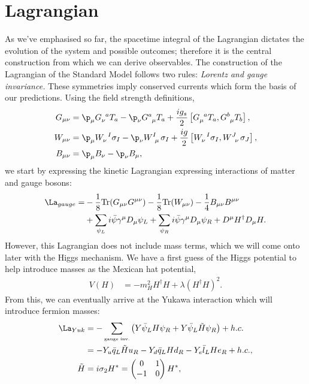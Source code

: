 \documentclass[relqm.tex]{subfiles}
\begin{document}
\section{Lagrangian}
As we've emphasised so far, the spacetime integral of the Lagrangian dictates the evolution of the system and possible outcomes; therefore it is the central construction from which we can derive observables.
The construction of the Lagrangian of the Standard Model follows two rules: \emph{Lorentz and gauge invariance.}
These symmetries imply conserved currents which form the basis of our predictions.
Using the field strength definitions, 
\begin{align}
    G_{\mu\nu} &= \p_\mu \tensor{G}{_\nu^a}T_a - \p_\nu\tensor{G}{^a_\mu}T_a + \frac{ig_s}{2}\left[\tensor{G}{_\mu^a}T_a,\tensor{G}{^b_\mu}T_b\right], \\
    W_{\mu\nu} &= \p_\mu \tensor{W}{_\nu^I}\sigma_I - \p_\nu\tensor{W}{^I_\mu}\sigma_I + \frac{ig}{2}\left[\tensor{W}{_\nu^I}\sigma_I,\tensor{W}{^J_\nu}\sigma_J\right], \\
    B_{\mu\nu} &= \p_\mu B_\nu - \p_\nu B_\mu,
\end{align}
we start by expressing the kinetic Lagrangian expressing interactions of matter and gauge bosons:
\begin{align}
    \begin{split}
        \La_{gauge} = &-\frac18\text{Tr}(G_{\mu\nu}G^{\mu\nu})-\frac18\text{Tr}(W_{\mu\nu}) - \frac14B_{\mu\nu}B^{\mu\nu} \\
                      &+ \sum_{\psi_L} i\bar{\psi}\gamma^\mu D_\mu\psi_L + \sum_{\psi_R}i\bar{\psi}\gamma^\mu D_\mu \psi_R + D^\mu H^\dagger D_\mu H.
    \end{split}
\end{align}
However, this Lagrangian does not include mass terms, which we will come onto later with the Higgs mechanism.
We have a first guess of the Higgs potential to help introduce masses as the Mexican hat potential,
\begin{align}
    V(H) &= -m_H^2H^\dagger H + \lambda(H^\dagger H)^2.
\end{align}
From this, we can eventually arrive at the Yukawa interaction which will introduce fermion masses:
\begin{align}
    \La_{Yuk} &= -\sum_{\text{\tiny gauge inv.}} \left(Y\bar{\psi}_L H\psi_R + Y\bar{\psi}_L\tilde{H}\psi_R\right) + h.c. \\
              &= -Y_u\bar{q}_L\tilde{H}u_R - Y_d\bar{q}_L Hd_R - Y_e\bar{l}_L He_R + h.c., \\
    \tilde{H} &= i\sigma_2 H^* = \begin{pmatrix} 0 & 1 \\ -1 & 0 \end{pmatrix}H^*,
\end{align}
\end{document}
